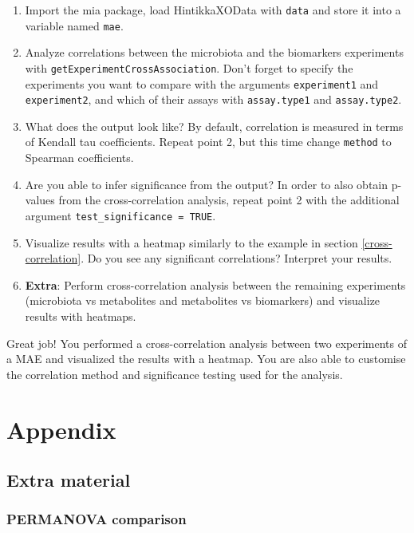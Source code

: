 \documentclass[
]{book}
\providecommand{\tightlist}{%
  \setlength{\itemsep}{0pt}\setlength{\parskip}{0pt}}
\begin{document}
\begin{enumerate}
\def\labelenumi{\arabic{enumi}.}
\tightlist
\item
  Import the mia package, load HintikkaXOData with \texttt{data} and store it into a
  variable named \texttt{mae}.
\item
  Analyze correlations between the microbiota and the biomarkers experiments
  with \texttt{getExperimentCrossAssociation}. Don't forget to specify the experiments
  you want to compare with the arguments \texttt{experiment1} and \texttt{experiment2}, and
  which of their assays with \texttt{assay.type1} and \texttt{assay.type2}.
\item
  What does the output look like? By default, correlation is measured in terms
  of Kendall tau coefficients. Repeat point 2, but this time change \texttt{method}
  to Spearman coefficients.
\item
  Are you able to infer significance from the output? In order to also obtain
  p-values from the cross-correlation analysis, repeat point 2 with the
  additional argument \texttt{test\_significance\ =\ TRUE}.
\item
  Visualize results with a heatmap similarly to the example in section
  \ref{cross-correlation}. Do you see any significant correlations?
  Interpret your results.
\item
  \textbf{Extra}: Perform cross-correlation analysis between the remaining
  experiments (microbiota vs metabolites and metabolites vs biomarkers) and
  visualize results with heatmaps.
\end{enumerate}

Great job! You performed a cross-correlation analysis between two experiments of
a MAE and visualized the results with a heatmap. You are also able to customise
the correlation method and significance testing used for the analysis.

\hypertarget{part-appendix}{%
\part{Appendix}\label{part-appendix}}

\hypertarget{extras}{%
\chapter{Extra material}\label{extras}}

\hypertarget{compare-permanova}{%
\section{PERMANOVA comparison}\label{compare-permanova}}
\end{document}
